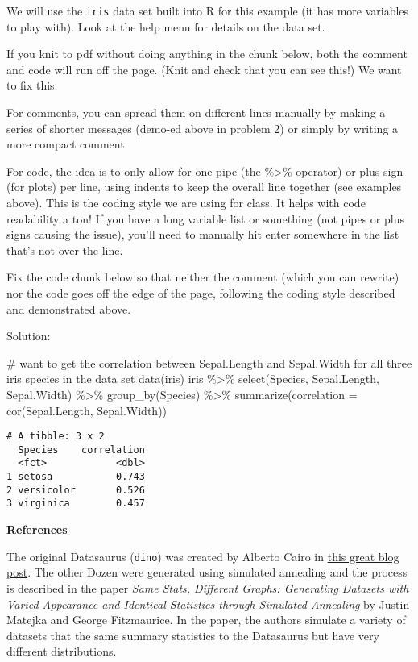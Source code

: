 \documentclass[
  letterpaper,
  DIV=11,
  numbers=noendperiod]{scrartcl}
\newenvironment{Shaded}{\begin{snugshade}}{\end{snugshade}}
\newcommand{\AttributeTok}[1]{\textcolor[rgb]{0.40,0.45,0.13}{#1}}
\newcommand{\CommentTok}[1]{\textcolor[rgb]{0.37,0.37,0.37}{#1}}
\newcommand{\FunctionTok}[1]{\textcolor[rgb]{0.28,0.35,0.67}{#1}}
\newcommand{\NormalTok}[1]{\textcolor[rgb]{0.00,0.23,0.31}{#1}}
\newcommand{\SpecialCharTok}[1]{\textcolor[rgb]{0.37,0.37,0.37}{#1}}
\begin{document}
We will use the \texttt{iris} data set built into R for this example (it
has more variables to play with). Look at the help menu for details on
the data set.

If you knit to pdf without doing anything in the chunk below, both the
comment and code will run off the page. (Knit and check that you can see
this!) We want to fix this.

For comments, you can spread them on different lines manually by making
a series of shorter messages (demo-ed above in problem 2) or simply by
writing a more compact comment.

For code, the idea is to only allow for one pipe (the \%\textgreater\%
operator) or plus sign (for plots) per line, using indents to keep the
overall line together (see examples above). This is the coding style we
are using for class. It helps with code readability a ton! If you have a
long variable list or something (not pipes or plus signs causing the
issue), you'll need to manually hit enter somewhere in the list that's
not over the line.

Fix the code chunk below so that neither the comment (which you can
rewrite) nor the code goes off the edge of the page, following the
coding style described and demonstrated above.

Solution:

\begin{Shaded}
\begin{Highlighting}[]
\CommentTok{\# want to get the correlation between Sepal.Length and Sepal.Width for all three iris species in the data set}
\FunctionTok{data}\NormalTok{(iris)}
\NormalTok{iris }\SpecialCharTok{\%\textgreater{}\%} \FunctionTok{select}\NormalTok{(Species, Sepal.Length, Sepal.Width) }\SpecialCharTok{\%\textgreater{}\%} \FunctionTok{group\_by}\NormalTok{(Species) }\SpecialCharTok{\%\textgreater{}\%} \FunctionTok{summarize}\NormalTok{(}\AttributeTok{correlation =} \FunctionTok{cor}\NormalTok{(Sepal.Length, Sepal.Width)) }
\end{Highlighting}
\end{Shaded}

\begin{verbatim}
# A tibble: 3 x 2
  Species    correlation
  <fct>            <dbl>
1 setosa           0.743
2 versicolor       0.526
3 virginica        0.457
\end{verbatim}

\newpage

\textbf{References}

The original Datasaurus (\texttt{dino}) was created by Alberto Cairo in
\href{http://www.thefunctionalart.com/2016/08/download-datasaurus-never-trust-summary.html}{this
great blog post}. The other Dozen were generated using simulated
annealing and the process is described in the paper \emph{Same Stats,
Different Graphs: Generating Datasets with Varied Appearance and
Identical Statistics through Simulated Annealing} by Justin Matejka and
George Fitzmaurice. In the paper, the authors simulate a variety of
datasets that the same summary statistics to the Datasaurus but have
very different distributions.
\end{document}
